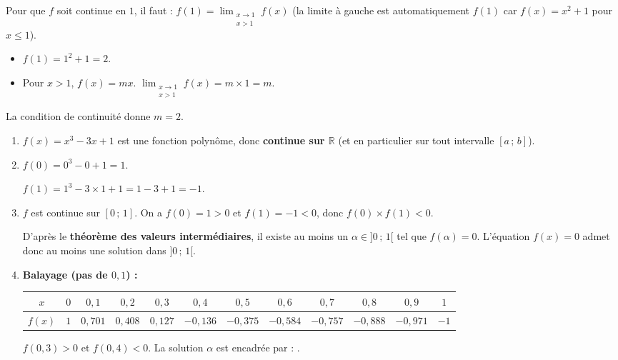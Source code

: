 \documentclass[11pt]{article}
\begin{document}
\begin{corrige}
Pour que $f$ soit continue en $1$, il faut : $f(1) = \displaystyle\lim_{\substack{x \to 1 \\ x > 1}} f(x)$ (la limite à gauche est automatiquement $f(1)$ car $f(x)=x^2+1$ pour $x\leq 1$).
\begin{itemize}
\item $f(1) = 1^2 + 1 = 2$.
\item Pour $x > 1$, $f(x) = mx$. $\displaystyle\lim_{\substack{x \to 1 \\ x > 1}} f(x) = m \times 1 = m$.
\end{itemize}
La condition de continuité donne $m = 2$.
\par
{}
\end{corrige}

\begin{corrige}
\begin{enumerate}
\item $f(x) = x^3 - 3x + 1$ est une fonction polynôme, donc \textbf{continue sur $\mathbb{R}$} (et en particulier sur tout intervalle $[a\,;\,b]$).
\item $f(0) = 0^3 - 0 + 1 = \boxed{1}$. \par
$f(1) = 1^3 - 3\times 1 + 1 = 1 - 3 + 1 = \boxed{-1}$.
\item $f$ est continue sur $[0\,;\,1]$. On a $f(0)=1 > 0$ et $f(1)=-1 < 0$, donc $f(0)\times f(1) < 0$. \par
D'après le \textbf{théorème des valeurs intermédiaires}, il existe au moins un $\alpha \in ]0\,;\,1[$ tel que $f(\alpha) = 0$. L'équation $f(x)=0$ admet donc au moins une solution dans $]0\,;\,1[$.
\item \textbf{Balayage (pas de $0{,}1$) :}
\begin{center}
\begin{tabular}{|c|ccccccccccc|}\hline
$x$ & $0$ & $0,1$ & $0,2$ & $0,3$ & $0,4$ & $0,5$ & $0,6$ & $0,7$ & $0,8$ & $0,9$ & $1$ \\ \hline
$f(x)$ & $1$ & $0,701$ & $0,408$ & $0,127$ & $-0,136$ & $-0,375$ & $-0,584$ & $-0,757$ & $-0,888$ & $-0,971$ & $-1$ \\ \hline
\end{tabular}
\end{center}
$f(0,3) > 0$ et $f(0,4) < 0$. La solution $\alpha$ est encadrée par : .
\end{enumerate}
\end{corrige}
\end{document}

